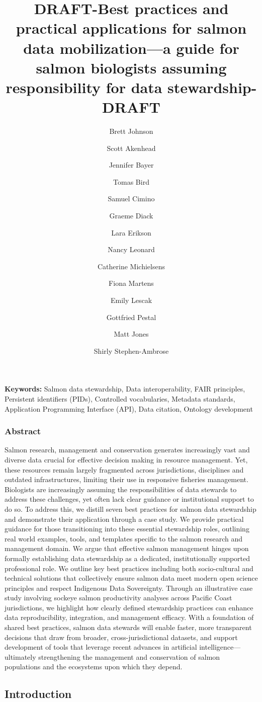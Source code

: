 \documentclass[
  letterpaper,
  DIV=11,
  numbers=noendperiod]{scrartcl}
\title{DRAFT-Best practices and practical applications for salmon data
mobilization---a guide for salmon biologists assuming responsibility for
data stewardship-DRAFT}
\author{Brett Johnson \and Scott Akenhead \and Jennifer Bayer \and Tomas
Bird \and Samuel Cimino \and Graeme Diack \and Lara Erikson \and Nancy
Leonard \and Catherine Michielsens \and Fiona Martens \and Emily
Lescak \and Gottfried Pestal \and Matt Jones \and Shirly
Stephen-Ambrose}
\date{}
\begin{document}
\maketitle


\textbf{Keywords:} Salmon data stewardship, Data interoperability, FAIR
principles, Persistent identifiers (PIDs), Controlled vocabularies,
Metadata standards, Application Programming Interface (API), Data
citation, Ontology development

\subsubsection{Abstract}\label{abstract}

Salmon research, management and conservation generates increasingly vast
and diverse data crucial for effective decision making in resource
management. Yet, these resources remain largely fragmented across
jurisdictions, disciplines and outdated infrastructures, limiting their
use in responsive fisheries management. Biologists are increasingly
assuming the responsibilities of data stewards to address these
challenges, yet often lack clear guidance or institutional support to do
so. To address this, we distill seven best practices for salmon data
stewardship and demonstrate their application through a case study. We
provide practical guidance for those transitioning into these essential
stewardship roles, outlining real world examples, tools, and templates
specific to the salmon research and management domain. We argue that
effective salmon management hinges upon formally establishing data
stewardship as a dedicated, institutionally supported professional role.
We outline key best practices including both socio-cultural and
technical solutions that collectively ensure salmon data meet modern
open science principles and respect Indigenous Data Sovereignty. Through
an illustrative case study involving sockeye salmon productivity
analyses across Pacific Coast jurisdictions, we highlight how clearly
defined stewardship practices can enhance data reproducibility,
integration, and management efficacy. With a foundation of shared best
practices, salmon data stewards will enable faster, more transparent
decisions that draw from broader, cross-jurisdictional datasets, and
support development of tools that leverage recent advances in artificial
intelligence---ultimately strengthening the management and conservation
of salmon populations and the ecosystems upon which they depend.

\subsection{Introduction}\label{introduction}
\end{document}

